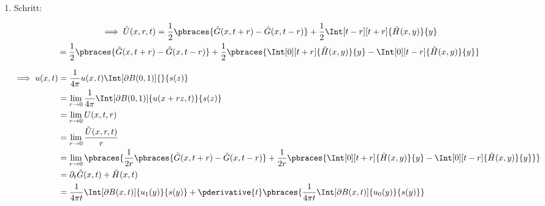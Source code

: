 \begin{solution}
\begin{enumerate}[label = \arabic*.]
\begin{enumerate}[label = 2.\arabic*.]
    \end{enumerate}
    
    \item Schritt:
    

    \begin{multline*}
        \implies
        \tilde U(x, r, t)
        =
        \frac{1}{2}
        \pbraces
        {
            \tilde G(x, t + r)
            -
            \tilde G(x, t - r)
        }
        +
        \frac{1}{2}
        \Int[t-r][t+r]{\tilde H(x, y)}{y} \\
        =
        \frac{1}{2}
        \pbraces
        {
            \tilde G(x, t + r)
            -
            \tilde G(x, t - r)
        }
        +
        \frac{1}{2}
        \pbraces
        {
            \Int[0][t+r]{\tilde H(x, y)}{y}
            -
            \Int[0][t-r]{\tilde H(x, y)}{y}
        }
    \end{multline*}

    \begin{align*}
        \implies
        u(x, t)
        & =
        \frac{1}{4 \pi}
        u(x, t)
        \Int[\partial B(0, 1)]{}{s(z)} \\
        & =
        \lim_{r \to 0}
        \frac{1}{4 \pi}
        \Int[\partial B(0, 1)]{u(x + r z, t)}{s(z)} \\
        & =
        \lim_{r \to 0}
        U(x, t, r) \\
        & =
        \lim_{r \to 0}
        \frac{\tilde U(x, r, t)}{r} \\
        & =
        \lim_{r \to 0}
        \pbraces
        {
            \frac{1}{2 r}
            \pbraces
            {
                \tilde G(x, t + r)
                -
                \tilde G(x, t - r)
            }
            +
            \frac{1}{2 r}
            \pbraces
            {
                \Int[0][t+r]{\tilde H(x, y)}{y}
                -
                \Int[0][t-r]{\tilde H(x, y)}{y}
            }
        } \\
        & =
        \partial_t \tilde G(x, t) + \tilde H(x, t) \\
        & =
        \frac{1}{4 \pi t}
        \Int[\partial B(x, t)]{u_1(y)}{s(y)}
        +
        \pderivative{t}
        \pbraces
        {
            \frac{1}{4 \pi t}
            \Int[\partial B(x, t)]{u_0(y)}{s(y)}
        }
    \end{align*}

\end{enumerate}

\end{solution}

